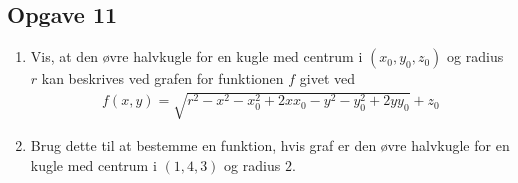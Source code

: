 \subsection*{Opgave 11}
\begin{enumerate}[label=\roman*)]
	\item Vis, at den øvre halvkugle for en kugle med centrum i $(x_0,y_0,z_0)$ og radius $r$ kan beskrives ved grafen for funktionen $f$ givet ved
	\begin{align*}
		f(x,y) = \sqrt{r^2-x^2-x_0^2+2xx_0-y^2-y_0^2+2yy_0} +z_0
	\end{align*}
	\item Brug dette til at bestemme en funktion, hvis graf er den øvre halvkugle for en kugle med centrum i $(1,4,3)$ og radius $2$.
\end{enumerate}
